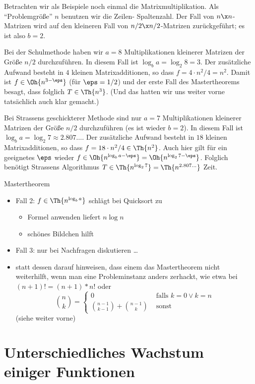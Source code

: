 Betrachten wir als Beispiele noch einmal die Matrixmultiplikation. Als
"`Problemgröße"' $n$ benutzen wir die Zeilen- \bzw Spaltenzahl.  Der
Fall von $n\x n$-Matrizen wird auf den kleineren Fall von $n/2 \x
n/2$-Matrizen zurückgeführt; es ist also $b=2$.

Bei der Schulmethode haben wir $a=8$ Multiplikationen kleinerer
Matrizen der Größe $n/2$ durchzuführen. In diesem
Fall ist $\log_b a=\log_2 8 = 3$.  Der zusätzliche Aufwand besteht in
$4$ kleinen Matrixadditionen, so dass $f=4\cdot n^2/4=n^2$.  Damit
ist $f\in \Oh{n^{3-\eps}}$ (\zB für $\eps=1/2$) und der erste Fall
des Mastertheorems besagt, dass folglich $T\in\Th{n^3}$. (Und das
hatten wir uns weiter vorne tatsächlich auch klar gemacht.)

Bei Strassens geschickterer Methode sind nur $a=7$ Multiplikationen
kleinerer Matrizen der Größe $n/2$ durchzuführen (es ist wieder
$b=2$). In diesem Fall ist $\log_b a=\log_2 7 \approx 2.807\dots$. Der
zusätzliche Aufwand besteht in $18$ kleinen Matrixadditionen, so dass
$f=18\cdot n^2/4\in \Th{n^2}$. Auch hier gilt für ein geeignetes
$\eps$ wieder $f\in \Oh{n^{\log_b a -\eps}} = \Oh{n^{\log_2
7-\eps}}$. Folglich benötigt Strassens Algorithmus
$T\in\Th{n^{\log_2 7}}= \Th{n^{2.807\dots}}$ Zeit.

\begin{tutorium}
  Mastertheorem
  \begin{itemize}
  \item Fall 2: $f \in \Th{n^{\log_b a}}$ schlägt bei Quicksort zu
    \begin{itemize}
    \item Formel anwenden liefert $n\log n$
    \item schönes Bildchen hilft 
    \end{itemize}
  \item Fall 3: nur bei Nachfragen diskutieren \dots
  \item statt dessen darauf hinweisen, dass einem das Mastertheorem
    nicht weiterhilft, wenn man eine Probleminstanz anders zerhackt,
    wie etwa bei  $(n+1)!=(n+1)*n!$ oder 
    \[
    \binom{n}{k}=\begin{cases}
      0 & \text{ falls } k=0\lor k=n\\
      \binom{n-1}{k-1}+\binom{n-1}{k} & \text{ sonst}
    \end{cases}
    \]
    (siehe weiter vorne)
  \end{itemize}
\end{tutorium}

\Tut\section{Unterschiedliches Wachstum einiger Funktionen}
\label{sec:wachstum-funktionen}

